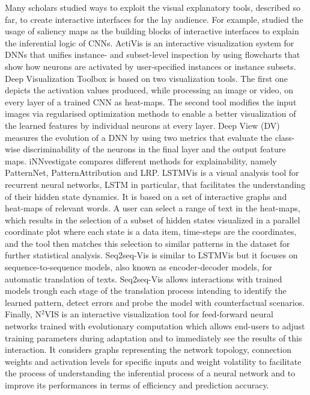 \documentclass[final,1p,times]{elsarticle}
\begin{document}
Many scholars studied ways to exploit the visual explanatory tools, described so far, to create interactive interfaces for the lay audience. For example, \cite{olah2018building} studied the usage of saliency maps as the building blocks of interactive interfaces to explain the inferential logic of CNNs. ActiVis \cite{kahng2018cti} is an interactive visualization system for DNNs that unifies instance- and subset-level inspection by using flowcharts that show how neurons are activated by user-specified instances or instance subsets. Deep Visualization Toolbox \cite{yosinski2015understanding} is based on two visualization tools. The first one depicts the activation values produced, while processing an image or video, on every layer of a trained CNN as heat-maps. The second tool modifies the input images via regularised optimization methods to enable a better visualization of the learned features by individual neurons at every layer. Deep View (DV) \cite{zhong2017evolutionary} measures the evolution of a DNN by using two metrics that evaluate the class-wise discriminability of the neurons in the final layer and the output feature maps. iNNvestigate \cite{alber2019innvestigate} compares different methods for explainability, namely PatternNet, PatternAttribution and LRP. LSTMVis \cite{strobelt2018lstmvis} is a visual analysis tool for recurrent neural networks, LSTM in particular, that facilitates the understanding of their hidden state dynamics. It is based on a set of interactive graphs and heat-maps of relevant words. A user can select a range of text in the heat-maps, which results in the selection of a subset of hidden states visualized in a parallel coordinate plot where each state is a data item, time-steps are the coordinates, and the tool then matches this selection to similar patterns in the dataset for further statistical analysis. Seq2seq-Vis \cite{strobelt2018s} is similar to LSTMVis but it focuses on sequence-to-sequence models, also known as encoder-decoder models, for automatic translation of texts. Seq2seq-Vis allows interactions with trained models trough each stage of the translation process intending to identify the learned pattern, detect errors and probe the model with counterfactual scenarios.
Finally, N$^2$VIS \cite{streeter2001nvis} is an interactive visualization tool for feed-forward neural networks trained with evolutionary computation which allows end-users to adjust training parameters during adaptation and to immediately see the results of this interaction. It considers graphs representing the network topology, connection weights and activation levels for specific inputs and weight volatility to facilitate the process of understanding the inferential process of a neural network and to improve its performances in terms of efficiency and prediction accuracy.
\end{document}
